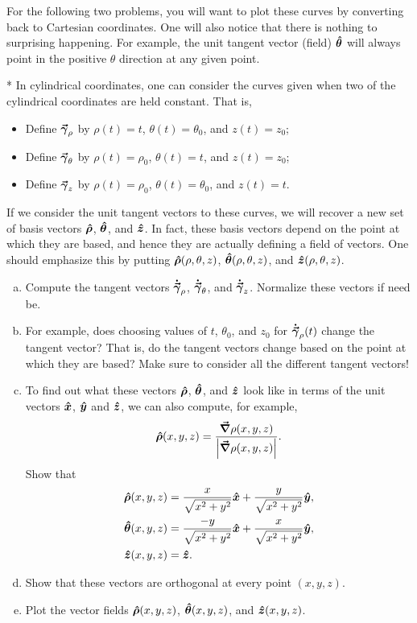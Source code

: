 \documentclass[12pt]{article} %
\begin{document}
\vspace*{1cm}
\begin{center}
For the following two problems, you will want to plot these curves by converting back to Cartesian coordinates.  One will also notice that there is nothing to surprising happening.  For example, the unit tangent vector (field) $\boldsymbol{\boldsymbol{\hat{\theta}}}$ will always point in the positive $\theta$ direction at any given point.
\end{center}

\vspace*{1cm}
\begin{problem}
* In cylindrical coordinates, one can consider the curves given when two of the cylindrical coordinates are held constant.  That is, 
\begin{itemize}
    \item Define $\boldsymbol{\vec{\gamma}}_\rho$ by $\rho(t)=t$, $\theta(t)=\theta_0$, and $z(t)=z_0$;
    \item Define $\boldsymbol{\vec{\gamma}}_\theta$ by $\rho(t)=\rho_0$, $\theta(t)=t$, and $z(t)=z_0$;
    \item Define $\boldsymbol{\vec{\gamma}}_z$ by $\rho(t)=\rho_0$, $\theta(t)=\theta_0$, and $z(t)=t$.
\end{itemize}
If we consider the unit tangent vectors to these curves, we will recover a new set of basis vectors $\boldsymbol{\boldsymbol{\hat{\rho}}}$, $\boldsymbol{\boldsymbol{\hat{\theta}}}$, and $\boldsymbol{\hat{z}}$.  In fact, these basis vectors depend on the point at which they are based, and hence they are actually defining a field of vectors.  One should emphasize this by putting $\boldsymbol{\boldsymbol{\hat{\rho}}}(\rho,\theta,z)$, $\boldsymbol{\boldsymbol{\hat{\theta}}}(\rho,\theta,z)$, and $\boldsymbol{\hat{z}}(\rho,\theta,z)$.
\begin{enumerate}[(a)]
    \item Compute the tangent vectors $\boldsymbol{\dot{\vec{\gamma}}}_\rho$, $\boldsymbol{\dot{\vec{\gamma}}}_\theta$, and $\boldsymbol{\dot{\vec{\gamma}}}_z$.  Normalize these vectors if need be.
    \item For example, does choosing values of $t$, $\theta_0$, and $z_0$ for $\boldsymbol{\dot{\vec{\gamma}}}_\rho(t)$ change the tangent vector? That is, do the tangent vectors change based on the point at which they are based? Make sure to consider all the different tangent vectors!
    \item To find out what these vectors $\boldsymbol{\boldsymbol{\hat{\rho}}}$, $\boldsymbol{\boldsymbol{\hat{\theta}}}$, and $\boldsymbol{\hat{z}}$ look like in terms of the unit vectors $\boldsymbol{\hat{x}}$, $\boldsymbol{\hat{y}}$ and $\boldsymbol{\hat{z}}$, we can also compute, for example,
    \[
    \boldsymbol{\boldsymbol{\hat{\rho}}}(x,y,z) = \frac{\boldsymbol{\vec{\nabla}} \rho(x,y,z)}{\left| \boldsymbol{\vec{\nabla}} \rho(x,y,z) \right|}.
    \]
    Show that
    \begin{align*}
        \boldsymbol{\boldsymbol{\hat{\rho}}}(x,y,z) &= \frac{x}{\sqrt{x^2+y^2}}\boldsymbol{\hat{x}} + \frac{y}{\sqrt{x^2+y^2}} \boldsymbol{\hat{y}},\\
        \boldsymbol{\boldsymbol{\hat{\theta}}}(x,y,z) &= \frac{-y}{\sqrt{x^2+y^2}} \boldsymbol{\hat{x}} + \frac{x}{\sqrt{x^2+y^2}} \boldsymbol{\hat{y}},\\
        \boldsymbol{\hat{z}}(x,y,z) &= \boldsymbol{\hat{z}}.
    \end{align*}
    \item Show that these vectors are orthogonal at every point $(x,y,z)$.
    \item Plot the vector fields $\boldsymbol{\boldsymbol{\hat{\rho}}}(x,y,z)$, $\boldsymbol{\boldsymbol{\hat{\theta}}}(x,y,z)$, and $\boldsymbol{\hat{z}}(x,y,z)$.
\end{enumerate}
\end{problem}
\end{document}
